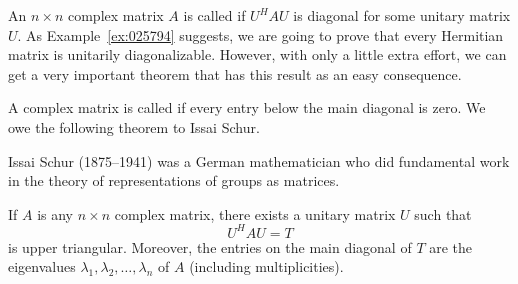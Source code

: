 \documentclass{ximera}
\begin{document}
An $n \times n$ complex matrix $A$ is called  if $U^{H}AU$ is diagonal for some unitary matrix $U$. As Example~\ref{ex:025794} suggests, we are going to prove that every Hermitian matrix is unitarily diagonalizable. However, with only a little extra effort, we can get a very important theorem that has this result as an easy consequence.

A complex matrix is called  if every entry below the main diagonal is zero. We owe the following theorem to Issai Schur.
\begin{remark}
Issai
 Schur (1875--1941) was a German mathematician who did fundamental work
in the theory of representations of groups as matrices.
\end{remark} 

\begin{theorem}\label{th:025814}
If $A$ is any $n \times n$ complex matrix, there exists a unitary matrix $U$ such that
\begin{equation*}
U^HAU = T
\end{equation*}
is upper triangular. Moreover, the entries on the main diagonal of $T$ are the eigenvalues $\lambda_{1}, \lambda_{2}, \ldots, \lambda_{n}$ of $A$ (including multiplicities).
\end{theorem}
\end{document}
